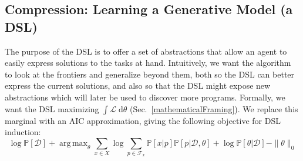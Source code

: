 \documentclass{article}
\newcommand{\system}{\textsc{SCC} }
\newcommand{\lowerBound}{\mathscr{L}}
\DeclareMathOperator*{\argmax}{arg\,max} %
\newcommand{\probability}{\mathds{P}} %
\begin{document}

\subsection{Compression: Learning a Generative Model (a DSL)}\label{grammarInductionSection}

The purpose of the DSL is to
offer a set of abstractions
that allow an agent to easily express solutions to the tasks at hand.
Intuitively, we want the algorithm to
look at  the frontiers and
generalize beyond them, 
both so the DSL can better express the current solutions,
and  also so that the DSL might expose new abstractions
which will later be used to
discover more programs.
 Formally, we want the DSL maximizing $\int \lowerBound\;\mathrm{d}\theta$ (Sec.~\ref{mathematicalFraming}).
We replace this marginal with an AIC approximation, giving the following objective for DSL induction:
\begin{equation}
      \log \probability[\mathcal{D}] + \argmax_{\theta}\sum_{x\in X}\log \sum_{p\in \mathcal{F}_x}\probability[x|p]\probability[p|\mathcal{D},\theta] + \log \probability[\theta|\mathcal{D}] - \|\theta\|_0 \label{AIC}
  \end{equation}
\end{document}
